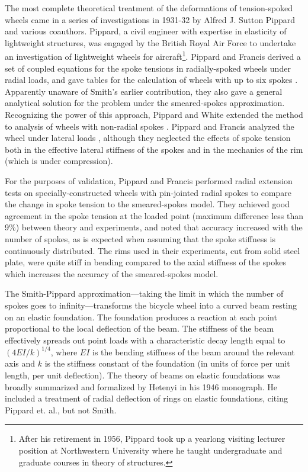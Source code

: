 \documentclass[../thesis.tex]{subfiles}
\begin{document}
The most complete theoretical treatment of the deformations of tension-spoked wheels came in a series of investigations in 1931-32 by Alfred J. Sutton Pippard and various coauthors. Pippard, a civil engineer with expertise in elasticity of lightweight structures, was engaged by the British Royal Air Force to undertake an investigation of lightweight wheels for aircraft\footnote{After his retirement in 1956, Pippard took up a yearlong visiting lecturer position at Northwestern University where he taught undergraduate and graduate courses in theory of structures.}. Pippard and Francis derived a set of coupled equations for the spoke tensions in radially-spoked wheels under radial loads, and gave tables for the calculation of wheels with up to six spokes \cite{PippardRad}. Apparently unaware of Smith's earlier contribution, they also gave a general analytical solution for the problem under the smeared-spokes approximation. Recognizing the power of this approach, Pippard and White extended the method to analysis of wheels with non-radial spokes \cite{PippardRadTan}. Pippard and Francis analyzed the wheel under lateral loads \cite{PippardLat}, although they neglected the effects of spoke tension both in the effective lateral stiffness of the spokes and in the mechanics of the rim (which is under compression).

For the purposes of validation, Pippard and Francis performed radial extension tests on specially-constructed wheels with pin-jointed radial spokes to compare the change in spoke tension to the smeared-spokes model. They achieved good agreement in the spoke tension at the loaded point (maximum difference less than 9\%) between theory and experiments, and noted that accuracy increased with the number of spokes, as is expected when assuming that the spoke stiffness is continuously distributed. The rims used in their experiments, cut from solid steel plate, were quite stiff in bending compared to the axial stiffness of the spokes which increases the accuracy of the smeared-spokes model.

The Smith-Pippard approximation---taking the limit in which the number of spokes goes to infinity---transforms the bicycle wheel into a curved beam resting on an elastic foundation. The foundation produces a reaction at each point proportional to the local deflection of the beam. The stiffness of the beam effectively spreads out point loads with a characteristic decay length equal to $(4EI/k)^{1/4}$, where $EI$ is the bending stiffness of the beam around the relevant axis and $k$ is the stiffness constant of the foundation (in units of force per unit length, per unit deflection). The theory of beams on elastic foundations was broadly summarized and formalized by Hetenyi \cite{Hetenyi} in his 1946 monograph. He included a treatment of radial deflection of rings on elastic foundations, citing Pippard et. al., but not Smith.
\end{document}
